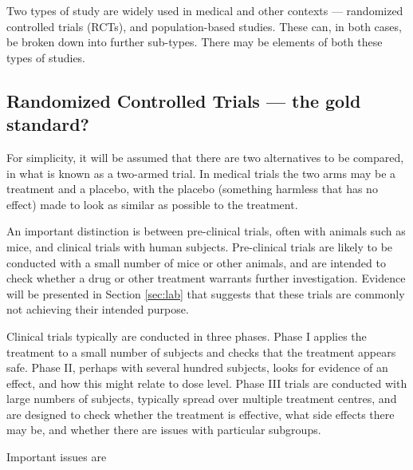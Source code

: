 \documentclass[
  10ptls,
  b5paper]{book}
\begin{document}
Two types of study are widely used in medical and other contexts ---
randomized controlled trials (RCTs), and population-based studies. These
can, in both cases, be broken down into further sub-types. There may be
elements of both these types of studies.

\hypertarget{randomized-controlled-trials-the-gold-standard}{%
\subsection*{Randomized Controlled Trials --- the gold standard?}\label{randomized-controlled-trials-the-gold-standard}}

For simplicity, it will be assumed that there are two alternatives to be
compared, in what is known as a two-armed trial. In medical trials the
two arms may be a treatment and a placebo, with the placebo (something
harmless that has no effect) made to look as similar as possible to the
treatment.

An important distinction is between pre-clinical trials, often with
animals such as mice, and clinical trials with human subjects.
Pre-clinical trials are likely to be conducted with a small number of
mice or other animals, and are intended to check whether a drug or other
treatment warrants further investigation. Evidence will be presented in
Section \ref{sec:lab} that suggests that these trials are commonly not
achieving their intended purpose.

Clinical trials typically are conducted in three phases. Phase I applies
the treatment to a small number of subjects and checks that the
treatment appears safe. Phase II, perhaps with several hundred subjects,
looks for evidence of an effect, and how this might relate to dose
level. Phase III trials are conducted with large numbers of subjects,
typically spread over multiple treatment centres, and are designed to
check whether the treatment is effective, what side effects there may
be, and whether there are issues with particular subgroups.

Important issues are
\end{document}
